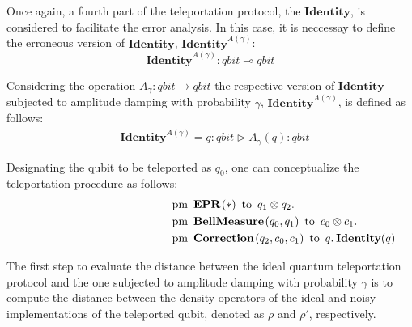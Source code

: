 Once again, a fourth part of the teleportation protocol, the $\textbf{Identity}$, is considered to facilitate the error analysis. In this case, it is neccessay to define the erroneous version of $\textbf{Identity}$, $\textbf{Identity}^{A(\gamma)}$:
\begin{equation}
  \textbf{Identity}^{A(\gamma)} : \textit{qbit}  \multimap \textit{qbit} 
\end{equation}

Considering the operation $A_{\gamma}: \textit{qbit} \xrightarrow{}  \textit{qbit}$  the respective version of $\textbf{Identity}$  subjected to amplitude damping with probability $\gamma$, $\textbf{Identity}^{A(\gamma)}$,  is defined as follows:
\begin{align}
  &\textbf{Identity}^{A(\gamma)} =  q: \textit{qbit}  \triangleright  A_{\gamma} (q) : \textit{qbit} 
\end{align}

Designating the qubit to be teleported as $q_0$, one can conceptualize the teleportation procedure as follows:
\begin{equation}
  \begin{split}
    \hspace{130 pt}& \text{pm} \hspace{5pt} \textbf{EPR}\hspace{1pt} (*) \hspace{5pt} \text{to} \hspace{5pt}  q_{1} \otimes q_{2}.  \notag \\
    & \text{pm}\hspace{5pt} \textbf{BellMeasure} \hspace{1pt} (q_0,q_{1}) \hspace{5pt}  \text{to} \hspace{5pt} c_{0}\otimes c_{1} . \notag \\
    & \text{pm} \hspace{5pt}  \textbf{Correction} \hspace{1pt} ( q_{2},  c_{0}, c_{1} ) \hspace{5pt} \text{to} \hspace{5pt}  q. \hspace{2pt}  \textbf{Identity}(q)
  \end{split}
\end{equation}

The first step to evaluate the distance between the ideal quantum teleportation protocol and the one subjected to amplitude damping with probability $\gamma$ is to compute the distance between the density operators of the ideal and noisy implementations of the teleported qubit, denoted as $\rho$ and $\rho'$, respectively.

